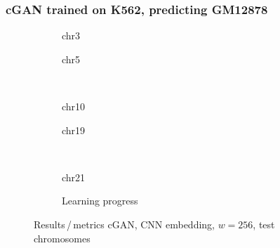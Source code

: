 \subsubsection{cGAN trained on K562, predicting GM12878}\label{sec:appendix:reverseTrainTest}
\begin{figure}[h!] %
    \begin{subfigure}{0.45\textwidth}
        \scriptsize
        \caption{chr3}
    \end{subfigure} \hfill
    \begin{subfigure}{0.45\textwidth}
        \scriptsize
        \caption{chr5}
    \end{subfigure}\\[5mm]
    \begin{subfigure}{0.45\textwidth}
        \scriptsize
        \caption{chr10}
    \end{subfigure}\hfill
    \begin{subfigure}{0.45\textwidth}
        \scriptsize
        \caption{chr19}
    \end{subfigure}\\[3mm]
    \centering
    \begin{subfigure}{0.45\textwidth}
        \scriptsize
        \caption{chr21}
    \end{subfigure} \hfill
    \begin{subfigure}{0.45\textwidth}
        \scriptsize
        \caption{Learning progress} \label{fig:appendix:GAN256_K-on-G_lossEpochs}
    \end{subfigure}
    \caption{Results\,/\,metrics cGAN, CNN embedding, $w=256$, test chromosomes}   \label{fig:appendix:GAN256_K-on-G_pearson}
\end{figure}
